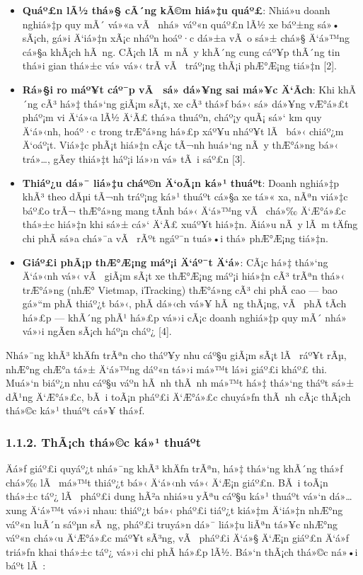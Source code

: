 \documentclass[a4paper]{extarticle}
\providecommand{\tightlist}{%
  \setlength{\itemsep}{0pt}\setlength{\parskip}{0pt}}
\begin{document}
\begin{itemize}
\tightlist
\item
  \textbf{Quáº£n lÃ½ thá»§ cÃ´ng kÃ©m hiá»‡u quáº£}: Nhiá»u doanh nghiá»‡p quy mÃ´ vá»«a
  vÃ  nhá» váº«n quáº£n lÃ½ xe báº±ng sá»• sÃ¡ch, gá»i Ä‘iá»‡n xÃ¡c nháº­n hoáº·c dá»±a vÃ o sá»±
  chá»§ Ä‘á»™ng cá»§a khÃ¡ch hÃ ng. CÃ¡ch lÃ m nÃ y khÃ´ng cung cáº¥p thÃ´ng tin thá»i
  gian thá»±c vá» vá»‹ trÃ­ vÃ  tráº¡ng thÃ¡i phÆ°Æ¡ng tiá»‡n {[}2{]}.
\item
  \textbf{Rá»§i ro máº¥t cáº¯p vÃ  sá»­ dá»¥ng sai má»¥c Ä‘Ã­ch}: Khi khÃ´ng cÃ³ há»‡ thá»‘ng
  giÃ¡m sÃ¡t, xe cÃ³ thá»ƒ bá»‹ sá»­ dá»¥ng vÆ°á»£t pháº¡m vi Ä‘á»‹a lÃ½ Ä‘Ã£ thá»a thuáº­n, cháº¡y
  quÃ¡ sá»‘ km quy Ä‘á»‹nh, hoáº·c trong trÆ°á»ng há»£p xáº¥u nháº¥t lÃ  bá»‹ chiáº¿m Ä‘oáº¡t.
  Viá»‡c phÃ¡t hiá»‡n cÃ¡c tÃ¬nh huá»‘ng nÃ y thÆ°á»ng bá»‹ trá»…, gÃ¢y thiá»‡t háº¡i lá»›n vá»
  tÃ i sáº£n {[}3{]}.
\item
  \textbf{Thiáº¿u dá»¯ liá»‡u cháº©n Ä‘oÃ¡n ká»¹ thuáº­t}: Doanh nghiá»‡p khÃ³ theo dÃµi
  tÃ¬nh tráº¡ng ká»¹ thuáº­t cá»§a xe tá»« xa, nÃªn viá»‡c báº£o trÃ¬ thÆ°á»ng mang tÃ­nh bá»‹
  Ä‘á»™ng vÃ  chá»‰ Ä‘Æ°á»£c thá»±c hiá»‡n khi sá»± cá»‘ Ä‘Ã£ xuáº¥t hiá»‡n. Äiá»u nÃ y lÃ m tÄƒng
  chi phÃ­ sá»­a chá»¯a vÃ  rÃºt ngáº¯n tuá»•i thá» phÆ°Æ¡ng tiá»‡n.
\item
  \textbf{Giáº£i phÃ¡p thÆ°Æ¡ng máº¡i Ä‘áº¯t Ä‘á»}: CÃ¡c há»‡ thá»‘ng Ä‘á»‹nh vá»‹ vÃ  giÃ¡m sÃ¡t xe thÆ°Æ¡ng
  máº¡i hiá»‡n cÃ³ trÃªn thá»‹ trÆ°á»ng (nhÆ° Vietmap, iTracking) thÆ°á»ng cÃ³ chi phÃ­
  cao --- bao gá»“m phÃ­ thiáº¿t bá»‹, phÃ­ dá»‹ch vá»¥ hÃ ng thÃ¡ng, vÃ  phÃ­ tÃ­ch há»£p
  --- khÃ´ng phÃ¹ há»£p vá»›i cÃ¡c doanh nghiá»‡p quy mÃ´ nhá» vá»›i ngÃ¢n sÃ¡ch háº¡n
  cháº¿ {[}4{]}.
\end{itemize}

Nhá»¯ng khÃ³ khÄƒn trÃªn cho tháº¥y nhu cáº§u giÃ¡m sÃ¡t lÃ  ráº¥t rÃµ, nhÆ°ng chÆ°a tá»±
Ä‘á»™ng dáº«n tá»›i má»™t lá»i giáº£i kháº£ thi. Muá»‘n biáº¿n nhu cáº§u váº­n hÃ nh thÃ nh má»™t
há»‡ thá»‘ng tháº­t sá»± dÃ¹ng Ä‘Æ°á»£c, bÃ i toÃ¡n pháº£i Ä‘Æ°á»£c chuyá»ƒn thÃ nh cÃ¡c thÃ¡ch
thá»©c ká»¹ thuáº­t cá»¥ thá»ƒ.

\subsubsection{1.1.2. ThÃ¡ch thá»©c ká»¹
thuáº­t}\label{112-thuxe1ch-thux1ee9c-kux1ef9-thuux1eadt}

Äá»ƒ giáº£i quyáº¿t nhá»¯ng khÃ³ khÄƒn trÃªn, há»‡ thá»‘ng khÃ´ng thá»ƒ chá»‰ lÃ  má»™t thiáº¿t
bá»‹ Ä‘á»‹nh vá»‹ Ä‘Æ¡n giáº£n. BÃ i toÃ¡n thá»±c táº¿ lÃ  pháº£i dung hÃ²a nhiá»u yÃªu cáº§u ká»¹
thuáº­t vá»‘n dá»… xung Ä‘á»™t vá»›i nhau: thiáº¿t bá»‹ pháº£i tiáº¿t kiá»‡m Ä‘iá»‡n nhÆ°ng váº«n
luÃ´n sáºµn sÃ ng, pháº£i truyá»n dá»¯ liá»‡u liÃªn tá»¥c nhÆ°ng váº«n chá»‹u Ä‘Æ°á»£c máº¥t
sÃ³ng, vÃ  pháº£i Ä‘á»§ Ä‘Æ¡n giáº£n Ä‘á»ƒ triá»ƒn khai thá»±c táº¿ vá»›i chi phÃ­ há»£p lÃ½. Bá»‘n
thÃ¡ch thá»©c ná»•i báº­t lÃ :
\end{document}
